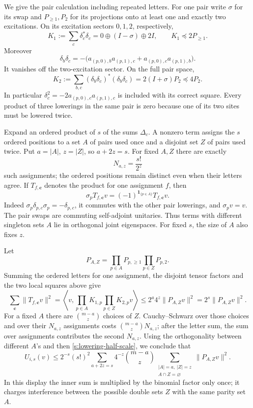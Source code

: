 We give the pair calculation including repeated letters.  For one pair
write \(\sigma\) for its swap and \(P_{\ge1},P_2\) for its projections
onto at least one and exactly two excitations.  On its excitation
sectors \(0,1,2\), respectively,
\[
 K_1:=\sum_c\delta_c^*\delta_c
    =0\oplus(I-\sigma)\oplus2I,\qquad K_1\preceq2P_{\ge1}.
\]
Moreover
\[
 \delta_b\delta_c
   =-\bigl(a_{(p,0),b}a_{(p,1),c}
           +a_{(p,0),c}a_{(p,1),b}\bigr).
\]
It vanishes off the two-excitation sector.  On the full pair space,
\[
 K_2:=\sum_{b,c}(\delta_b\delta_c)^*(\delta_b\delta_c)
        =2(I+\sigma)P_2\preceq4P_2.
\]
In particular \(\delta_c^2=-2a_{(p,0),c}a_{(p,1),c}\) is included
with its correct square.  Every product of three lowerings in the same
pair is zero because one of its two sites must be lowered twice.

Expand an ordered product of \(s\) of the sums \(\Delta_c\).
A nonzero term assigns the \(s\) ordered positions to a set \(A\) of
pairs used once and a disjoint set \(Z\) of pairs used twice.
Put \(a=|A|\), \(z=|Z|\), so \(a+2z=s\).  For fixed \(A,Z\) there
are exactly
\[
 N_{a,z}=\frac{s!}{2^z}
\]
such assignments; the ordered positions remain distinct even when
their letters agree.  If \(T_{f,\mathbf c}\) denotes the product for
one assignment \(f\), then
\[
 \sigma_p T_{f,\mathbf c}v
     =(-1)^{\mathbf1_{\{p\in A\}}}T_{f,\mathbf c}v .
\]
Indeed \(\sigma_p\delta_{p,c}\sigma_p=-\delta_{p,c}\),
it commutes with the other pair lowerings, and \(\sigma_pv=v\).
The pair swaps are commuting self-adjoint unitaries.  Thus terms with
different singleton sets \(A\) lie in orthogonal joint eigenspaces.
For fixed \(s\), the size of \(A\) also fixes \(z\).

Let
\[
 P_{A,Z}=\prod_{p\in A}P_{p,\ge1}\prod_{p\in Z}P_{p,2}.
\]
Summing the ordered letters for one assignment, the disjoint tensor
factors and the two local squares above give
\[
 \sum_{\mathbf c}\|T_{f,\mathbf c}v\|^2
 =\left\langle v,
        \prod_{p\in A}K_{1,p}\prod_{p\in Z}K_{2,p}v\right\rangle
 \le2^a4^z\|P_{A,Z}v\|^2=2^s\|P_{A,Z}v\|^2.
\]
For a fixed \(A\) there are \(\binom{m-a}{z}\) choices of \(Z\).
Cauchy--Schwarz over those choices and over their \(N_{a,z}\)
assignments costs \(\binom{m-a}{z}N_{a,z}\); after the letter sum,
the sum over assignments contributes the second \(N_{a,z}\).
Using the orthogonality between different \(A\)'s and then
\eqref{s:lowering-half-scale}, we conclude that
\begin{equation}\label{s:lowering-pair-upper}
 U_{i,s}(v)\le
 2^{-s}(s!)^2
 \sum_{a+2z=s}4^{-z}\binom{m-a}{z}
       \sum_{\substack{|A|=a,\ |Z|=z\\A\cap Z=\varnothing}}
                  \|P_{A,Z}v\|^2 .
\end{equation}
In this display the inner sum is multiplied by the binomial factor only
once; it charges interference between the possible double sets \(Z\)
with the same parity set \(A\).

